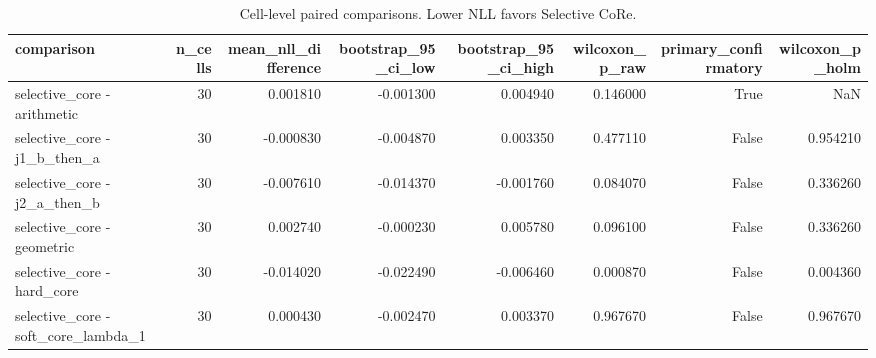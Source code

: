 \begin{table}
\caption{Cell-level paired comparisons. Lower NLL favors Selective CoRe.}
\label{tab:real_statistics}
\begin{tabular}{lrrrrrrr}
\toprule
comparison & n\_cells & mean\_nll\_difference & bootstrap\_95\_ci\_low & bootstrap\_95\_ci\_high & wilcoxon\_p\_raw & primary\_confirmatory & wilcoxon\_p\_holm \\
\midrule
selective\_core - arithmetic & 30 & 0.001810 & -0.001300 & 0.004940 & 0.146000 & True & NaN \\
selective\_core - j1\_b\_then\_a & 30 & -0.000830 & -0.004870 & 0.003350 & 0.477110 & False & 0.954210 \\
selective\_core - j2\_a\_then\_b & 30 & -0.007610 & -0.014370 & -0.001760 & 0.084070 & False & 0.336260 \\
selective\_core - geometric & 30 & 0.002740 & -0.000230 & 0.005780 & 0.096100 & False & 0.336260 \\
selective\_core - hard\_core & 30 & -0.014020 & -0.022490 & -0.006460 & 0.000870 & False & 0.004360 \\
selective\_core - soft\_core\_lambda\_1 & 30 & 0.000430 & -0.002470 & 0.003370 & 0.967670 & False & 0.967670 \\
\bottomrule
\end{tabular}
\end{table}
